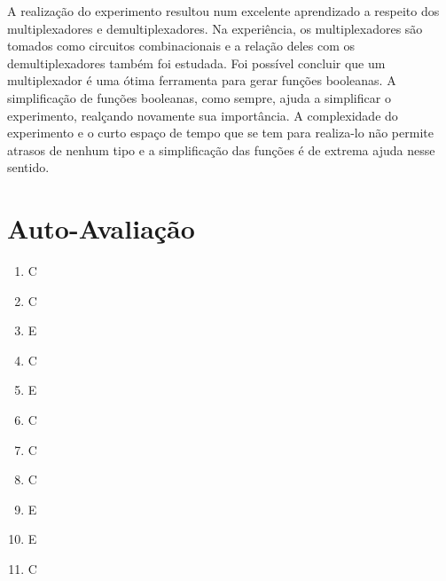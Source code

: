 \documentclass[12pt]{article}
\begin{document}
A realização do experimento resultou num excelente aprendizado a respeito dos multiplexadores e demultiplexadores. Na experiência, os multiplexadores são tomados como circuitos combinacionais e a relação deles com os demultiplexadores também foi estudada.
Foi possível concluir que um multiplexador é uma ótima ferramenta para gerar funções booleanas. A simplificação de funções booleanas, como sempre, ajuda a simplificar o experimento, realçando novamente sua importância. A complexidade do experimento e o curto espaço de tempo que se tem para realiza-lo não permite atrasos de nenhum tipo e a simplificação das funções é de extrema ajuda nesse sentido.

\newpage 
\section*{Auto-Avaliação}

\begin{enumerate}
    \item C
    \item C
    \item E
    \item C
    \item E
    \item C
    \item C
    \item C
    \item E
    \item E
    \item C
\end{enumerate}
\end{document}
